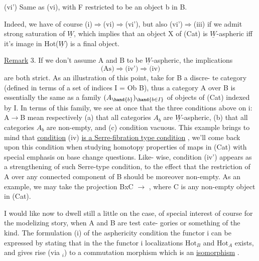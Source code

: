 
(vi') Same as (vi), with F restricted to be an object b in B.

Indeed, we have of course (i)$\Rightarrow$(vi)$\Rightarrow$(vi'), but also (vi')$\Rightarrow$(iii)
if we admit strong saturation of $\underline{W}$, which implies that an object X of
(Cat) is $\underline{W}$-aspheric iff it's image in Hot($\underline{W}$) is a final object.

\uline{Remark} 3. If we don't assume A and B to be $\underline{W}$-aspheric, the implications
\[ \text{(As)} \Longrightarrow \text{(iv')} \Longrightarrow \text{(iv)} \]
are both strict. As an illustration of this point, take for B a discre-%
te category (defined in terms of a set of indices I = Ob B), thus a
  category A over B is essentially the same as a family $(A_{\hand{b}})_{\hand{b\in I}}$
of objects of (Cat) indexed by I. In terms of this family, we see at
once that the three conditions above on i: A$\rightarrow$B mean respectively
(a) that all categories $A_b$ are $\underline{W}$-aspheric, (b) that all categories
$A_b$ are non-empty, and (c) condition vacuous. This example brings to
mind that \uline{condition} (iv) \uline{is a Serre-fibration type condition} , we'll
come back upon this condition when studying  homotopy properties
of maps in (Cat)\hand{,} with special emphasis on base change questions. Like-%
wise, condition (iv') appears as a strengthening of such Serre-type
condition, to the effect that the restriction of A over any connected
component of B should be moreover non-empty. As an example, we may take
the projection BxC $\rightarrow$  , where C is any non-empty object in (Cat).

I would like now to dwell still a little on the case, of special
interest of course for the modelizing story, when A and B are test cate-%
gories or something of the kind. The formulation (i) of the asphericity
condition  the functor i can be expressed by stating that in the
the functor i\hand{$\overline{\phantom{i}}^{*}$}   localizations $\mathrm{Hot}_B$ and $\mathrm{Hot}_A$ exists, and gives
rise (via \hand{$\lambda$}$_i$) to a commutation morphism which is an \uline{isomorphism}
.

